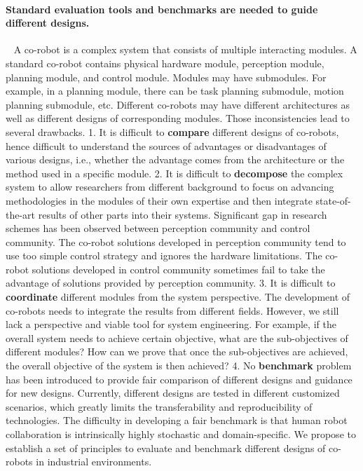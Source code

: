 \paragraph*{Standard evaluation tools and benchmarks are needed to guide different designs. }~
A co-robot is a complex system that consists of multiple interacting modules. A standard co-robot contains physical hardware module, perception module, planning module, and control module. Modules may have submodules. For example, in a planning module, there can be task planning submodule, motion planning submodule, etc. Different co-robots may have different architectures as well as different designs of corresponding modules. Those inconsistencies lead to several drawbacks. 1. It is difficult to \textbf{compare} different designs of co-robots, hence difficult to understand the sources of advantages or disadvantages of various designs, i.e., whether the advantage comes from the architecture or the method used in a specific module.
2. It is difficult to \textbf{decompose} the complex system to allow researchers from different background to focus on advancing methodologies in the modules of their own expertise and then integrate state-of-the-art results of other parts into their systems. Significant gap in research schemes has been observed between perception community and control community. The co-robot solutions developed in perception community tend to use too simple control strategy and ignores the hardware limitations. The co-robot solutions developed in control community sometimes fail to take the advantage of solutions provided by perception community.
3. It is difficult to \textbf{coordinate} different modules from the system perspective. The development of co-robots needs to integrate the results from different fields. However, we still lack a perspective and viable tool for system engineering. For example, if the overall system needs to achieve certain objective, what are the sub-objectives of different modules? How can we prove that once the sub-objectives are achieved, the overall objective of the system is then achieved?
4. No \textbf{benchmark} problem has been introduced to provide fair comparison of different designs and guidance for new designs. Currently, different designs are tested in different customized scenarios, which greatly limits the transferability and reproducibility of technologies. The difficulty in developing a fair benchmark is that human robot collaboration is intrinsically highly stochastic and domain-specific.  
We propose to establish a set of principles to evaluate and benchmark different designs of  co-robots in industrial environments.

